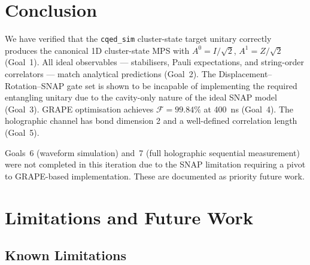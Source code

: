 \documentclass[aps,pra,twocolumn,reprint,floatfix,amsmath,amssymb]{revtex4-2}
\begin{document}
\section{Conclusion}\label{sec:conclusion}

We have verified that the \texttt{cqed\_sim} cluster-state target
unitary correctly produces the canonical 1D cluster-state MPS with
$A^0=I/\sqrt{2}$, $A^1=Z/\sqrt{2}$ (Goal~1).  All ideal observables ---
stabilisers, Pauli expectations, and string-order correlators ---
match analytical predictions (Goal~2).  The Displacement--Rotation--SNAP
gate set is shown to be incapable of implementing the required
entangling unitary due to the cavity-only nature of the ideal SNAP
model (Goal~3).  GRAPE optimisation achieves $\mathcal{F}=99.84\%$ at
\SI{400}{ns} (Goal~4).  The holographic channel has bond dimension 2 and
a well-defined correlation length (Goal~5).

Goals~6 (waveform simulation) and~7 (full holographic sequential
measurement) were not completed in this iteration due to the SNAP
limitation requiring a pivot to GRAPE-based implementation.  These
are documented as priority future work.

\section{Limitations and Future Work}\label{sec:future}

\subsection{Known Limitations}
\end{document}
